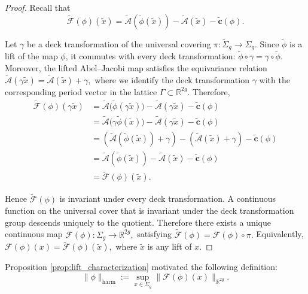 \documentclass[11pt]{article}
\theoremstyle{definition}
\begin{document}
	\begin{proof}
		Recall that
		\[
		\widetilde{\mathcal F}(\phi)(\tilde x)
		=
		\widetilde{\mathcal A}(\widetilde\phi(\tilde x))
		-
		\widetilde{\mathcal A}(\tilde x)
		-
		\widetilde{\mathbf c}(\phi).
		\]
		
		Let $\gamma$ be a deck transformation of the universal covering $\pi:\widetilde{\Sigma}_g\longrightarrow\Sigma_g.$ Since $\widetilde\phi$ is a lift of the map $\phi$, it commutes with every deck transformation: $\widetilde\phi\circ\gamma = \gamma\circ\widetilde\phi.$ Moreover, the lifted Abel--Jacobi map satisfies the equivariance relation $\widetilde{\mathcal A}(\gamma\tilde x) = \widetilde{\mathcal A}(\tilde x) + \gamma,$ where we identify the deck transformation $\gamma$ with the corresponding period vector in the lattice $\Gamma\subset\mathbb R^{2g}$. Therefore,
		\[
		\begin{aligned}
			\widetilde{\mathcal F}(\phi)(\gamma\tilde x)
			&=
			\widetilde{\mathcal A}
			\bigl(
			\widetilde\phi(\gamma\tilde x)
			\bigr)
			-
			\widetilde{\mathcal A}(\gamma\tilde x)
			-
			\widetilde{\mathbf c}(\phi)\\
			&=
			\widetilde{\mathcal A}
			\bigl(
			\gamma\widetilde\phi(\tilde x)
			\bigr)
			-
			\widetilde{\mathcal A}(\gamma\tilde x)
			-
			\widetilde{\mathbf c}(\phi)\\
			&=
			\left(
			\widetilde{\mathcal A}(\widetilde\phi(\tilde x))
			+\gamma
			\right)
			-
			\left(
			\widetilde{\mathcal A}(\tilde x)
			+\gamma
			\right)
			-
			\widetilde{\mathbf c}(\phi)\\
			&=
			\widetilde{\mathcal A}(\widetilde\phi(\tilde x))
			-
			\widetilde{\mathcal A}(\tilde x)
			-
			\widetilde{\mathbf c}(\phi)\\
			&=
			\widetilde{\mathcal F}(\phi)(\tilde x).
		\end{aligned}
		\]
		
		Hence $\widetilde{\mathcal F}(\phi)$ is invariant under every deck
		transformation. A continuous function on the universal cover that is invariant
		under the deck transformation group descends uniquely to the quotient. Therefore
		there exists a unique continuous map $\mathcal F(\phi):\Sigma_g\longrightarrow
		\mathbb R^{2g},$ satisfying $\widetilde{\mathcal F}(\phi) = \mathcal
		F(\phi)\circ\pi.$ Equivalently, $\mathcal F(\phi)(x) = \widetilde{\mathcal
			F}(\phi)(\tilde x),$ where $\tilde x$ is any lift of $x$.
	\end{proof}
	
	Proposition \ref{prop:lift_characterization} motivated the following definition:
	\begin{equation}
		\|\phi\|_{\mathrm{harm}} := \sup_{x \in \Sigma_g} \|\mathcal{F}(\phi)(x)\|_{\mathbb{R}^{2g}}.
	\end{equation}
	
\end{document}
